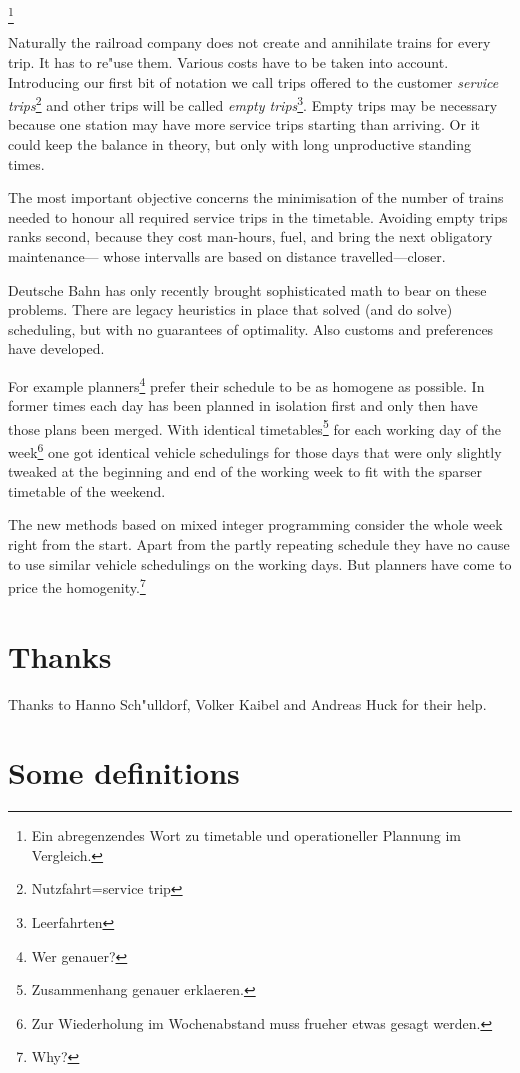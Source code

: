 \documentclass[a4paper]{amsart} %
\newcommand{\todo}[1]{\footnote{#1}}
\begin{document}
\todo{Ein abregenzendes Wort zu timetable und operationeller Plannung
  im Vergleich.}

Naturally the railroad company does not create and annihilate trains
for every trip.  It has to re"use them.  Various costs have to be
taken into account.  Introducing our first bit of notation we call
trips offered to the customer \textit{service
  trips}\todo{Nutzfahrt=service trip} and other trips will be called
\textit{empty trips}\todo{Leerfahrten}.  Empty trips may be necessary
because one station may have more service trips starting than
arriving.  Or it could keep the balance in theory, but only with long
unproductive standing times.

The most important objective concerns the minimisation of the number
of trains needed to honour all required service trips in the
timetable.  Avoiding empty trips ranks second, because they cost
man-hours, fuel, and bring the next obligatory maintenance--- whose
intervalls are based on distance travelled---closer.

Deutsche Bahn has only recently brought sophisticated math to bear on
these problems.  There are legacy heuristics in place that solved (and
do solve) scheduling, but with no guarantees of optimality.  Also
customs and preferences have developed.

For example planners\todo{Wer genauer?} prefer their schedule to be as
homogene as possible.  In former times each day has been planned in
isolation first and only then have those plans been merged.  With
identical timetables\todo{Zusammenhang genauer erklaeren.} for each
working day of the week\todo{Zur Wiederholung im Wochenabstand muss
  frueher etwas gesagt werden.} one got identical vehicle schedulings
for those days that were only slightly tweaked at the beginning and
end of the working week to fit with the sparser timetable of the
weekend.

The new methods based on mixed integer programming consider the whole
week right from the start.  Apart from the partly repeating schedule
they have no cause to use similar vehicle schedulings on the working
days.  But planners have come to price the homogenity.\todo{Why?}
\section{Thanks}
Thanks to Hanno Sch"ulldorf, Volker Kaibel and Andreas Huck for their help.

\section{Some definitions}
\end{document}

